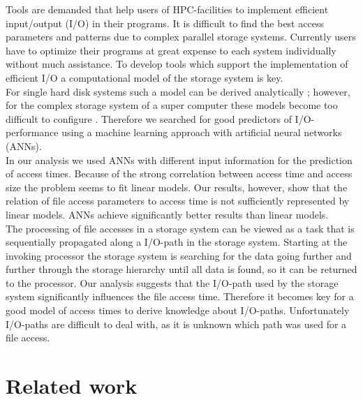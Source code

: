 \documentclass{superfri}
\begin{document}
Tools are demanded that help users of HPC-facilities to implement efficient input/output (I/O) in their programs.
It is difficult to find the best access parameters and patterns due to complex parallel storage systems.
Currently users have to optimize their programs at great expense to each system individually without much assistance.
To develop tools which support the implementation of efficient I/O a computational model of the storage system is key.\\
For single hard disk systems such a model can be derived analytically \cite{Ruemmler94anintroduction}; however, for the complex storage system of a super computer these models become too difficult to configure \cite{DBLP:conf/npc/ZhangLZJC10}.
Therefore we searched for good predictors of I/O-performance using a machine learning approach with artificial neural networks (ANNs).\\
In our analysis we used ANNs with different input information for the prediction of access times.
Because of the strong correlation between access time and access size the problem seems to fit linear models.
Our results, however, show that the relation of file access parameters to access time is not sufficiently represented by linear models.
ANNs achieve significantly better results than linear models.\\
The processing of file accesses in a storage system can be viewed as a task that is sequentially propagated along a I/O-path in the storage system.
Starting at the invoking processor the storage system is searching for the data going further and further through the storage hierarchy until all data is found, so it can be returned to the processor.
Our analysis suggests that the I/O-path used by the storage system significantly influences the file access time.
Therefore it becomes key for a good model of access times to derive knowledge about I/O-paths.
Unfortunately I/O-paths are difficult to deal with, as it is unknown which path was used for a file access.

\section{Related work}
\label{sec:related}
\end{document}
